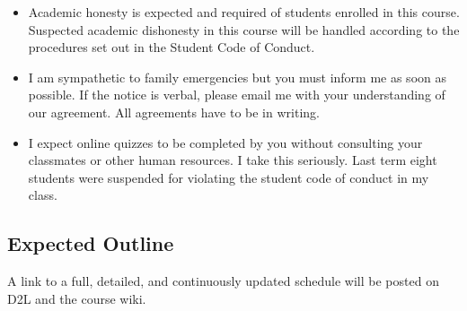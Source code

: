 \documentclass[letterpaper,10pt]{article}
\begin{document}
\begin{itemize}
\item Academic honesty is expected and required of students enrolled
  in this course.  Suspected academic dishonesty in this course will
  be handled according to the procedures set out in the Student Code
  of Conduct.

\item I am sympathetic to family emergencies but you must inform me as
  soon as possible. If the notice is verbal, please email me with your
  understanding of our agreement. All agreements have to be in
  writing.

\item I expect online quizzes to be completed by you without consulting your classmates or other human resources.  I take this seriously.  Last term eight students were suspended for violating the student code of conduct in my class.
\end{itemize}


\subsection{Expected Outline}
A link to a full, detailed, and continuously updated schedule will be
posted on D2L and the course wiki.
\end{document}
